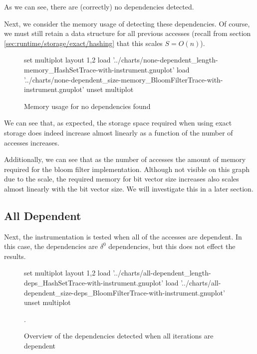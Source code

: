	As we can see, there are (correctly) no dependencies detected.
	
	Next, we consider the memory usage of detecting these dependencies. Of course, we must still retain a data structure for all previous accesses (recall from section \ref{sec:runtime/storage/exact/hashing} that this scales $S=O(n)$).
	
	\begin{figure}[H]
		\centering
		\begin{gnuplot}[terminal=pdf]
			set multiplot layout 1,2
				load '../charts/none-dependent_length-memory_HashSetTrace-with-instrument.gnuplot'
				load '../charts/none-dependent_size-memory_BloomFilterTrace-with-instrument.gnuplot'
			unset multiplot
		\end{gnuplot}
		\label{chart:none-dependent-memory-comparison}
		\caption{Memory usage for no dependencies found}
	\end{figure}
	
	We can see that, as expected, the storage space required when using exact storage does indeed increase almost linearly as a function of the number of accesses increases.
	
	Additionally, we can see that as the number of accesses the amount of memory required for the bloom filter implementation. Although not visible on this graph due to the scale, the required memory for bit vector size increases also scales almost linearly with the bit vector size. We will investigate this in a later section.
	
	\subsection{All Dependent} \label{sec:result/basic/all-dep}
	Next, the instrumentation is tested when all of the accesses are dependent. In this case, the dependencies are $\delta^{0}$ dependencies, but this does not effect the results.
	
	\begin{figure}[H]
		\begin{gnuplot}[terminal=pdf]
			set multiplot layout 1,2
				load '../charts/all-dependent_length-deps_HashSetTrace-with-instrument.gnuplot'
				load '../charts/all-dependent_size-deps_BloomFilterTrace-with-instrument.gnuplot'		
			unset multiplot
		\end{gnuplot}
		\label{chart:all-dependent-deps-comparison}
		\caption{Overview of the dependencies detected when all iterations are dependent}.
	\end{figure}
	
